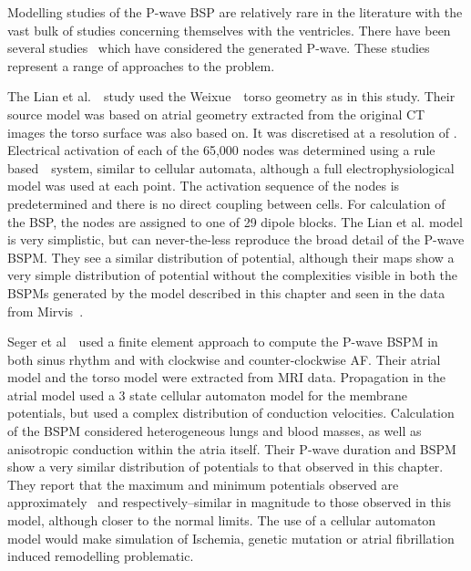 Modelling studies of the P-wave BSP are relatively rare in the literature with
the vast bulk of studies concerning themselves with the ventricles.
There have been several
studies~\cite{Lian2002,Seger2004,Oosterom2005,vanDam2005} which have considered
the generated P-wave.
These studies represent a range of approaches to the problem.

The Lian et al.~\cite{Lian2002}\ study used the Weixue~\cite{Lu1993,Weixue1996}\ torso
geometry as in this study.
Their source model was based on atrial geometry extracted from the original CT
images the torso surface was also based on.
It was discretised at a resolution of .
Electrical activation of each of the 65,000 nodes was determined using a rule
based~\cite{Lu1993}\ system, similar to cellular automata, although a full
electrophysiological model was used at each point.
The activation sequence of the nodes is predetermined and there is no direct
coupling between cells.
For calculation of the BSP, the nodes are assigned to one of 29 dipole blocks.
The Lian et al. model is very simplistic, but can never-the-less reproduce the
broad detail of the P-wave BSPM.
They see a similar distribution of potential, although their maps show a very
simple distribution of potential without the complexities visible in both the
BSPMs generated by the model described in this chapter and seen in the data from
Mirvis~\cite{Mirvis1980}.

Seger et al~\cite{Seger2004}\ used a finite element approach to compute the
P-wave BSPM in both sinus rhythm and with clockwise and counter-clockwise AF.
Their atrial model and the torso model were extracted from MRI data.
Propagation in the atrial model used a 3 state cellular automaton model for the
membrane potentials, but used a complex distribution of conduction velocities.
Calculation of the BSPM considered heterogeneous lungs and blood masses, as well
as anisotropic conduction within the atria itself.
Their P-wave duration and BSPM show a very similar distribution of potentials to
that observed in this chapter.
They report that the maximum and minimum potentials observed are approximately
\ and  respectively--similar in magnitude to those observed
in this model, although closer to the normal limits.
The use of a cellular automaton model would make simulation of Ischemia, genetic
mutation or atrial fibrillation induced remodelling problematic.

